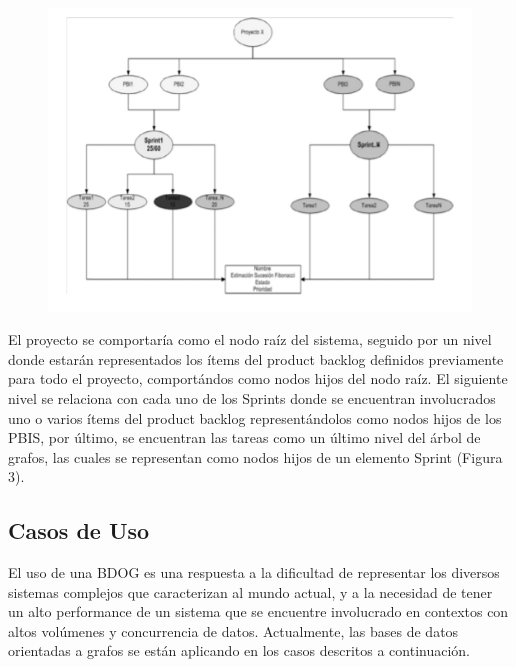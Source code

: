 \documentclass[preprint,12pt]{elsarticle}
\begin{document}
\begin{figure}[htb]
	\begin{center}
		\includegraphics[width=13cm]{./IMAGENES/basededatos_4} 
	\end{center}
\end{figure}

El proyecto se comportaría como el nodo raíz del sistema, seguido por un nivel donde estarán representados los ítems del product backlog definidos
previamente para todo el proyecto, comportándos  como nodos hijos del nodo raíz. El siguiente nivel se relaciona con cada uno de los Sprints donde
se encuentran involucrados uno o varios ítems del product backlog representándolos como nodos hijos de los PBIS, por último, se encuentran las tareas
como un último nivel del árbol de grafos, las cuales se representan como nodos hijos de un elemento Sprint (Figura 3).

\subsection{\textbf{Casos de Uso}}
El uso de una BDOG es una respuesta a la dificultad de representar los diversos sistemas complejos que caracterizan al mundo actual, y a la necesidad de tener un alto performance de un sistema que se encuentre involucrado en contextos con altos volúmenes y concurrencia de datos. Actualmente, las bases de datos orientadas a grafos se están aplicando en los casos descritos a continuación. \\
\end{document}
